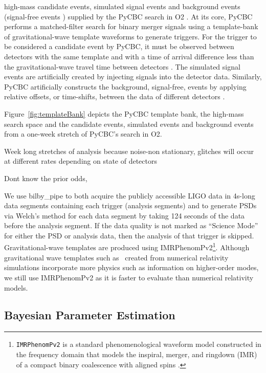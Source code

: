 \documentclass[%
 reprint,
 amsmath,amssymb,
 aps,
]{revtex4}
\newcommand{\bilbypipe}{{\sc bilby\_pipe}\xspace}
\newcommand{\imrphenomp}{{\sc IMRPhenomPv2}\xspace}
\newcommand{\pycbc}{{\sc PyCBC}\xspace}
\begin{document}
 


high-mass candidate events, simulated signal events and  background events (signal-free events ) supplied by the \pycbc \cite{pycbc_code} search in O2  \cite{pycbc_og0, pycbc_og1, pycbc_og2, pycbc_og3, pycbc_og4, pycbc_og5}.  At its core, \pycbc performs a matched-filter search for binary merger signals using a template-bank of gravitational-wave template waveforms to generate triggers. For the trigger to be considered a  candidate event by \pycbc, it must be observed between detectors with the same template and with a time of arrival difference less than the gravitational-wave travel time between detectors \cite{pycbc_og0}. The simulated signal events are artificially created by injecting signals into the detector data. Similarly, \pycbc artificially constructs the background, signal-free, events by applying relative offsets, or time-shifts, between the data of different detectors \cite{pycbc_og0}. 


Figure~\ref{fig:templateBank} depicts the \pycbc template bank, the high-mass search space and the candidate events, simulated events and background events from a one-week stretch of \pycbc's search in O2. 

Week long stretches of analysis because noise-non stationary, glitches will occur at different rates depending on state of detectors 


Dont know the prior odds, 


We use \bilbypipe to both acquire the publicly accessible LIGO data in 4s-long data segments containing each trigger (analysis segments) and to generate PSDs via Welch's method for each data segment by taking 124 seconds of the data before the analysis segment. If the data quality is not marked as ``Science Mode'' for either the PSD or analysis data, then the analysis of that trigger is skipped. Gravitational-wave templates
are produced using \imrphenomp \footnote{\texttt{IMRPhenomPv2} is a standard phenomenological waveform model constructed in the
  frequency domain that models the inspiral, merger, and ringdown (IMR) of a compact binary coalescence with aligned spins
  \citep{khan2016frequency}.}. Although gravitational wave templates such as \ created from numerical relativity simulations
incorporate more physics such as information on higher-order modes, we still use \imrphenomp as it is faster to evaluate than numerical
relativity models.

\hypertarget{bayesian-parameter-estimation}{%
\subsection{Bayesian Parameter Estimation}\label{bayesian-parameter-estimation}}
\end{document}
